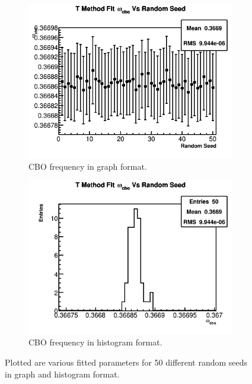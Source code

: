 \begin{figure}[]
\begin{subfigure}[t]{0.45\textwidth}
		    \centering
			\includegraphics[width=\textwidth]{TMethod_omega_cbo_Vs_Iter_Canv}
		    \caption{CBO frequency in graph format.}
	    \end{subfigure}
	    \hspace{4mm}
	    \begin{subfigure}[t]{0.45\textwidth}
		    \centering
			\includegraphics[width=\textwidth]{TMethod_omega_cbo_Vs_Iter_Canv_hist}
		    \caption{CBO frequency in histogram format.}
	    \end{subfigure}%
	\caption[TMethodRandomSeedsPars3]{Plotted are various fitted parameters for 50 different random seeds in graph and histogram format.}
	\label{fig:TMethodRandomSeedsPars3}
	\end{figure}

